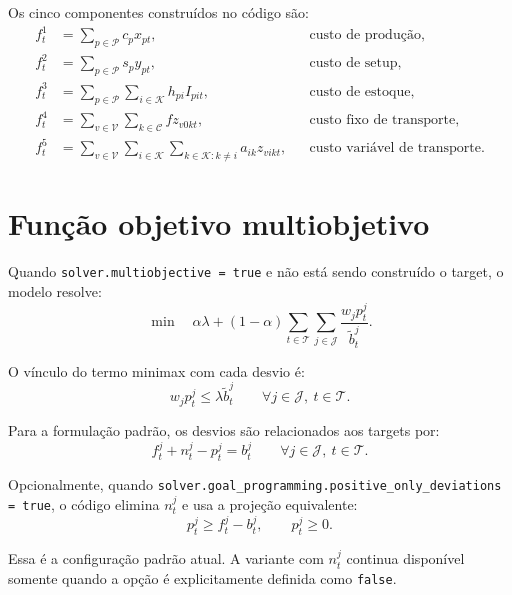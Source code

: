 \documentclass[11pt,a4paper]{article}
\newcommand{\set}[1]{\mathcal{#1}}
\begin{document}
Os cinco componentes construídos no código são:
\begin{align}
  f_t^1 &= \sum_{p\in\set{P}} c_p x_{pt},
  &&\text{custo de produção}, \label{eq:f1}\\
  f_t^2 &= \sum_{p\in\set{P}} s_p y_{pt},
  &&\text{custo de setup}, \label{eq:f2}\\
  f_t^3 &= \sum_{p\in\set{P}}\sum_{i\in\set{K}} h_{pi}I_{pit},
  &&\text{custo de estoque}, \label{eq:f3}\\
  f_t^4 &= \sum_{v\in\set{V}}\sum_{k\in\set{C}} f z_{v0kt},
  &&\text{custo fixo de transporte}, \label{eq:f4}\\
  f_t^5 &= \sum_{v\in\set{V}}\sum_{i\in\set{K}}\sum_{k\in\set{K}:k\ne i}
           a_{ik}z_{vikt},
  &&\text{custo variável de transporte}. \label{eq:f5}
\end{align}

\section{Função objetivo multiobjetivo}

Quando \texttt{solver.multiobjective = true} e não está sendo construído o
target, o modelo resolve:
\begin{equation}
  \min\quad
  \alpha\lambda
  +(1-\alpha)\sum_{t\in\set{T}}\sum_{j\in\set{J}}
  \frac{w_j p_t^j}{\widetilde b_t^j}.
  \label{eq:objective}
\end{equation}

O vínculo do termo minimax com cada desvio é:
\begin{equation}
  w_jp_t^j \le \lambda\widetilde b_t^j
  \qquad \forall j\in\set{J},\ t\in\set{T}.
  \label{eq:lambda}
\end{equation}

Para a formulação padrão, os desvios são relacionados aos targets por:
\begin{equation}
  f_t^j+n_t^j-p_t^j=b_t^j
  \qquad \forall j\in\set{J},\ t\in\set{T}.
  \label{eq:deviation-balance}
\end{equation}

Opcionalmente, quando
\texttt{solver.goal\_programming.positive\_only\_deviations = true},
o código elimina $n_t^j$ e usa a projeção equivalente:
\begin{equation}
  p_t^j\ge f_t^j-b_t^j,
  \qquad p_t^j\ge0.
  \label{eq:positive-only}
\end{equation}

Essa é a configuração padrão atual. A variante com $n_t^j$ continua disponível
somente quando a opção é explicitamente definida como \texttt{false}.
\end{document}

